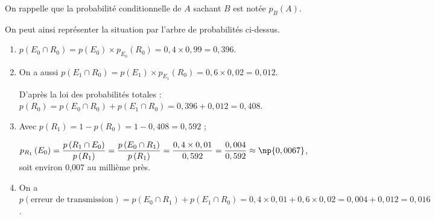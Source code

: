 On rappelle que la probabilité conditionnelle de $A$ sachant $B$ est notée $p_B(A)$.

On peut ainsi représenter la situation par l'arbre de probabilités ci-dessus.

\medskip

\begin{enumerate}
\item %
$p\left(E_0 \cap R_0\right) = p\left(E_0 \right) \times p_{E_0}\left(R_0 \right) = 0,4 \times 0,99 = 0,396$.

\item %
On a aussi $p\left(E_1 \cap R_0\right) = p\left(E_1 \right) \times p_{E_1}\left(R_0 \right) = 0,6 \times 0,02 = 0,012$.

 D'après la loi des probabilités totales : $p\left(R_0\right) = p\left(E_0 \cap R_0\right) + p\left(E_1 \cap R_0\right) = 0,396 + 0,012 = 0,408$.
\item %

Avec $p\left(R_1 \right) = 1 - p\left(R_0\right) = 1 - 0,408 = 0,592$ ;

$p_{R_1}\left(E_0\right) = \dfrac{p\left(R_1 \cap E_0 \right)}{p\left(R_1\right)} = \dfrac{p\left(E_0 \cap R_1 \right)}{p\left(R_1\right)} = \dfrac{0,4 \times 0,01}{0,592} = \dfrac{0,004}{0,592} \approx \np{0,0067}$, soit environ 0,007 au millième près.
\item %
On a $p(\text{erreur de transmission}) = p\left(E_0 \cap R_1\right) + p\left(E_1 \cap R_0\right) = 0,4 \times 0,01 + 0,6 \times 0,02 = 0,004 + 0,012 = 0,016$.
\end{enumerate}

